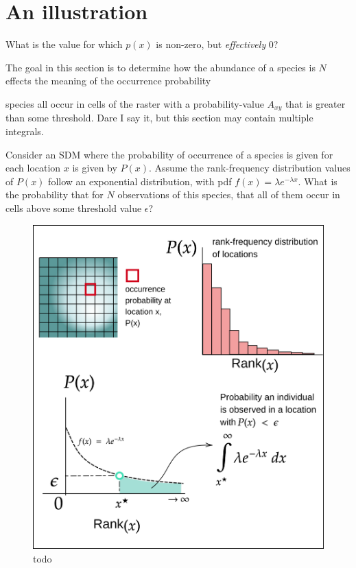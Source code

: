 \documentclass[11pt]{article}
\makeatletter
\def\maxwidth{\ifdim\Gin@nat@width>\linewidth\linewidth
\else\Gin@nat@width\fi}
\let\Oldincludegraphics\includegraphics
\renewcommand{\includegraphics}[1]{\Oldincludegraphics[width=\maxwidth]{#1}}
\makeatother
\begin{document}
\hypertarget{an-illustration}{%
\section{An illustration}\label{an-illustration}}

What is the value for which \(p(x)\) is non-zero, but \emph{effectively}
\(0\)?

The goal in this section is to determine how the abundance of a species
is \(N\) effects the meaning of the occurrence probability

species all occur in cells of the raster with a probability-value
\(A_{xy}\) that is greater than some threshold. Dare I say it, but this
section may contain multiple integrals.

Consider an SDM where the probability of occurrence of a species is
given for each location \(x\) is given by \(P(x)\). Assume the
rank-frequency distribution values of \(P(x)\) follow an exponential
distribution, with pdf \(f(x) = \lambda e^{-\lambda x}\). What is the
probability that for \(N\) observations of this species, that all of
them occur in cells above some threshold value \(\epsilon\)?

\begin{figure}
\hypertarget{fig:density}{%
\centering
\includegraphics{./figures/probdensity.png}
\caption{todo}\label{fig:density}
}
\end{figure}
\end{document}
